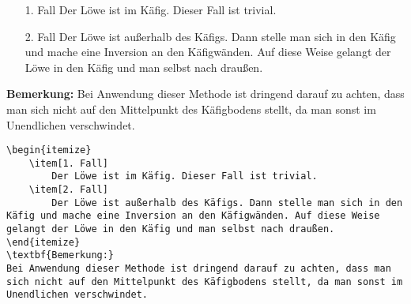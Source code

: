\documentclass["WS\space 16-17\space -\space LaTeX-Kurs\space -\space Praesentation\space -\space 2.tex"]{subfiles}
\begin{document}
\begin{frame}[fragile]
	\vspace{-0.2cm}
	\Losung
	\begin{outputbox}
		\vspace{-0.2cm}
		\begin{itemize}
			\item[1. Fall]
				Der Löwe ist im Käfig. Dieser Fall ist trivial.
			\item[2. Fall]
				Der Löwe ist außerhalb des Käfigs. Dann stelle man sich in den Käfig und mache eine Inversion an den Käfigwänden. Auf diese Weise gelangt der Löwe in den Käfig und man selbst nach draußen.
		\end{itemize}
		\vspace{-0.2cm}
		\textbf{Bemerkung:}
		Bei Anwendung dieser Methode ist dringend darauf zu achten, dass man sich nicht auf den Mittelpunkt des Käfigbodens stellt, da man sonst im Unendlichen verschwindet.
	\end{outputbox}
	
	\Code
	\vspace{-0.1cm}
	\begin{lstlisting}
\begin{itemize}
	\item[1. Fall]
		Der Löwe ist im Käfig. Dieser Fall ist trivial.
	\item[2. Fall]
		Der Löwe ist außerhalb des Käfigs. Dann stelle man sich in den Käfig und mache eine Inversion an den Käfigwänden. Auf diese Weise gelangt der Löwe in den Käfig und man selbst nach draußen.
\end{itemize}
\textbf{Bemerkung:}
Bei Anwendung dieser Methode ist dringend darauf zu achten, dass man sich nicht auf den Mittelpunkt des Käfigbodens stellt, da man sonst im Unendlichen verschwindet.
	\end{lstlisting}
\end{frame}
\end{document}
